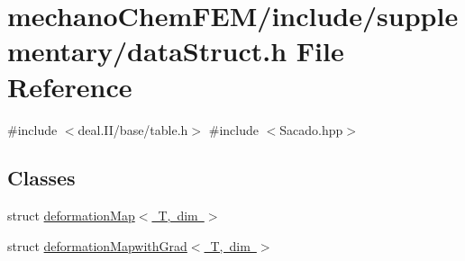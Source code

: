 \section{mechano\+Chem\+F\+E\+M/include/supplementary/data\+Struct.h File Reference}
\label{data_struct_8h}
{\ttfamily \#include $<$deal.\+I\+I/base/table.\+h$>$}\newline
{\ttfamily \#include $<$Sacado.\+hpp$>$}\newline
\subsection*{Classes}
\begin{DoxyCompactItemize}
\item 
struct \mbox{\hyperlink{structdeformation_map}{deformation\+Map$<$ T, dim $>$}}
\item 
struct \mbox{\hyperlink{structdeformation_mapwith_grad}{deformation\+Mapwith\+Grad$<$ T, dim $>$}}
\end{DoxyCompactItemize}
